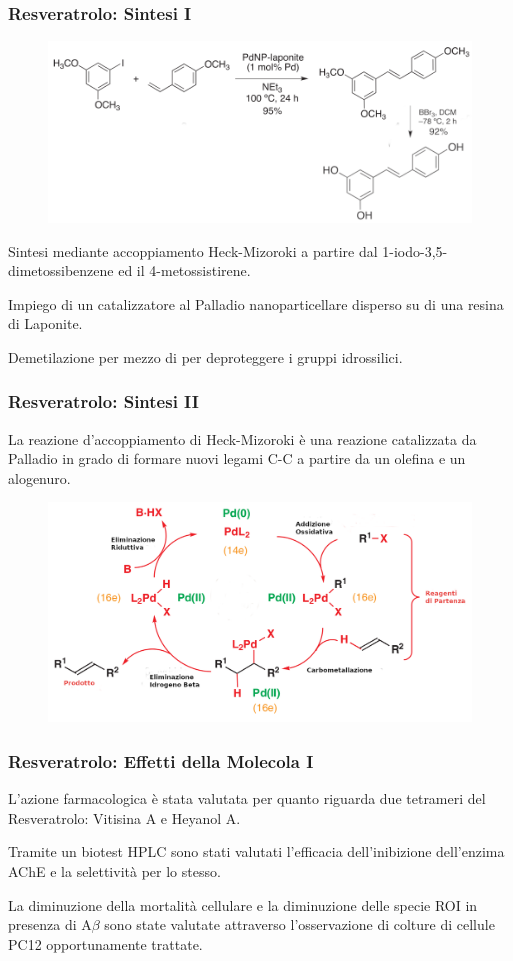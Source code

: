 \documentclass[9pt]{beamer}
\begin{document}
\begin{frame}
	\frametitle{Resveratrolo: Sintesi I}
	\begin{figure}
		\includegraphics{immagini/totale_resveratrolo.png}
	\end{figure}
	Sintesi mediante accoppiamento Heck-Mizoroki a partire dal 1-iodo-3,5-dimetossibenzene ed il 4-metossistirene.
	
	Impiego di un catalizzatore al Palladio nanoparticellare disperso su di una resina di Laponite.
	
	Demetilazione per mezzo di  per deproteggere i gruppi idrossilici.
	
\end{frame}

\begin{frame}
	\frametitle{Resveratrolo: Sintesi II}
	\bigskip
	La reazione d'accoppiamento di Heck-Mizoroki è una reazione catalizzata da Palladio in grado di formare nuovi legami C-C a partire da un olefina e un alogenuro.
	
	\begin{figure}
		\centering
		\includegraphics[width=\textwidth]{immagini/heck.png}
	\end{figure}
\end{frame}

\begin{frame}
	\frametitle{Resveratrolo: Effetti della Molecola I}
	L'azione farmacologica è stata valutata per quanto riguarda due tetrameri del Resveratrolo: Vitisina A e Heyanol A.
	
	Tramite un biotest HPLC sono stati valutati l'efficacia dell'inibizione dell'enzima AChE e la selettività per lo stesso.
	
	La diminuzione della mortalità cellulare e la diminuzione delle specie ROI in presenza di A$\beta$ sono state valutate attraverso l'osservazione di colture di cellule PC12 opportunamente trattate.
\end{frame}
\end{document}
